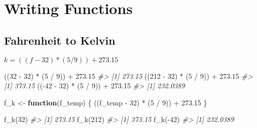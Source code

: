 \documentclass[
]{book}
\newenvironment{Shaded}{\begin{snugshade}}{\end{snugshade}}
\newcommand{\CommentTok}[1]{\textcolor[rgb]{0.56,0.35,0.01}{\textit{#1}}}
\newcommand{\ControlFlowTok}[1]{\textcolor[rgb]{0.13,0.29,0.53}{\textbf{#1}}}
\newcommand{\DecValTok}[1]{\textcolor[rgb]{0.00,0.00,0.81}{#1}}
\newcommand{\FloatTok}[1]{\textcolor[rgb]{0.00,0.00,0.81}{#1}}
\newcommand{\FunctionTok}[1]{\textcolor[rgb]{0.00,0.00,0.00}{#1}}
\newcommand{\NormalTok}[1]{#1}
\newcommand{\OtherTok}[1]{\textcolor[rgb]{0.56,0.35,0.01}{#1}}
\newcommand{\SpecialCharTok}[1]{\textcolor[rgb]{0.00,0.00,0.00}{#1}}
\begin{document}
\hypertarget{writing-functions}{%
\section{Writing Functions}\label{writing-functions}}

\hypertarget{fahrenheit-to-kelvin}{%
\subsection{Fahrenheit to Kelvin}\label{fahrenheit-to-kelvin}}

\(k = ((f - 32) * (5 / 9)) + 273.15\)

\begin{Shaded}
\begin{Highlighting}[]
\NormalTok{((}\DecValTok{32} \SpecialCharTok{{-}} \DecValTok{32}\NormalTok{) }\SpecialCharTok{*}\NormalTok{ (}\DecValTok{5} \SpecialCharTok{/} \DecValTok{9}\NormalTok{)) }\SpecialCharTok{+} \FloatTok{273.15}
\CommentTok{\#\textgreater{} [1] 273.15}
\NormalTok{((}\DecValTok{212} \SpecialCharTok{{-}} \DecValTok{32}\NormalTok{) }\SpecialCharTok{*}\NormalTok{ (}\DecValTok{5} \SpecialCharTok{/} \DecValTok{9}\NormalTok{)) }\SpecialCharTok{+} \FloatTok{273.15}
\CommentTok{\#\textgreater{} [1] 373.15}
\NormalTok{((}\SpecialCharTok{{-}}\DecValTok{42} \SpecialCharTok{{-}} \DecValTok{32}\NormalTok{) }\SpecialCharTok{*}\NormalTok{ (}\DecValTok{5} \SpecialCharTok{/} \DecValTok{9}\NormalTok{)) }\SpecialCharTok{+} \FloatTok{273.15}
\CommentTok{\#\textgreater{} [1] 232.0389}
\end{Highlighting}
\end{Shaded}

\begin{Shaded}
\begin{Highlighting}[]
\NormalTok{f\_k }\OtherTok{\textless{}{-}} \ControlFlowTok{function}\NormalTok{(f\_temp) \{}
\NormalTok{    ((f\_temp }\SpecialCharTok{{-}} \DecValTok{32}\NormalTok{) }\SpecialCharTok{*}\NormalTok{ (}\DecValTok{5} \SpecialCharTok{/} \DecValTok{9}\NormalTok{)) }\SpecialCharTok{+} \FloatTok{273.15}
\NormalTok{\}}
\end{Highlighting}
\end{Shaded}

\begin{Shaded}
\begin{Highlighting}[]
\FunctionTok{f\_k}\NormalTok{(}\DecValTok{32}\NormalTok{)}
\CommentTok{\#\textgreater{} [1] 273.15}
\FunctionTok{f\_k}\NormalTok{(}\DecValTok{212}\NormalTok{)}
\CommentTok{\#\textgreater{} [1] 373.15}
\FunctionTok{f\_k}\NormalTok{(}\SpecialCharTok{{-}}\DecValTok{42}\NormalTok{)}
\CommentTok{\#\textgreater{} [1] 232.0389}
\end{Highlighting}
\end{Shaded}
\end{document}
